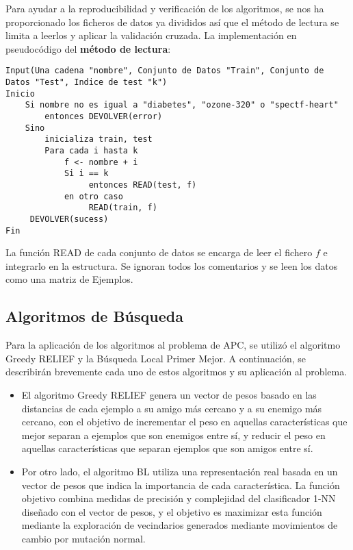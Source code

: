 Para ayudar a la reproducibilidad y verificación de los algoritmos, se nos ha proporcionado los ficheros de datos ya divididos así que el método de lectura se limita a leerlos y aplicar la validación cruzada. La implementación en pseudocódigo del \textbf{método de lectura}:

\begin{verbatim}
Input(Una cadena "nombre", Conjunto de Datos "Train", Conjunto de Datos "Test", Indice de test "k")
Inicio
    Si nombre no es igual a "diabetes", "ozone-320" o "spectf-heart"
        entonces DEVOLVER(error)
    Sino
        inicializa train, test
        Para cada i hasta k
            f <- nombre + i
            Si i == k
                 entonces READ(test, f)
            en otro caso
                 READ(train, f)
     DEVOLVER(sucess)
Fin
\end{verbatim}

La función READ de cada conjunto de datos se encarga de leer el fichero $f$ e integrarlo en la estructura. Se ignoran todos los comentarios y se leen los datos como una matriz de Ejemplos.\\

\subsection{Algoritmos de Búsqueda}

Para la aplicación de los algoritmos al problema de APC, se utilizó el algoritmo Greedy RELIEF y la Búsqueda Local Primer Mejor. A continuación, se describirán brevemente cada uno de estos algoritmos y su aplicación al problema.

\begin{itemize}
	\item El algoritmo Greedy RELIEF genera un vector de pesos basado en las distancias de cada ejemplo a su amigo más cercano y a su enemigo más cercano, con el objetivo de incrementar el peso en aquellas características que mejor separan a ejemplos que son enemigos entre sí, y reducir el peso en aquellas características que separan ejemplos que son amigos entre sí. 
	
	\item Por otro lado, el algoritmo BL utiliza una representación real basada en un vector de pesos que indica la importancia de cada característica. La función objetivo combina medidas de precisión y complejidad del clasificador 1-NN diseñado con el vector de pesos, y el objetivo es maximizar esta función mediante la exploración de vecindarios generados mediante movimientos de cambio por mutación normal.
\end{itemize}

